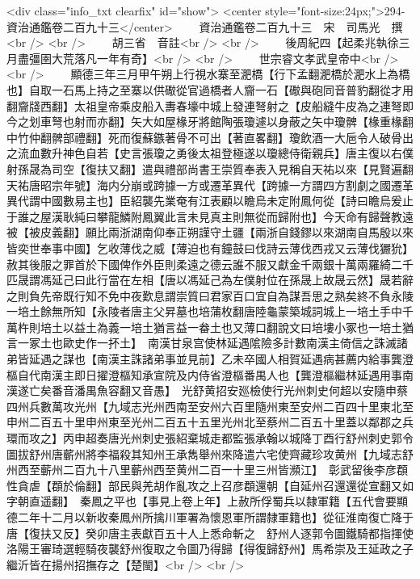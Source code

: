 <div class="info_txt clearfix" id="show">
<center style="font-size:24px;">294-資治通鑑卷二百九十三</center>
  　　資治通鑑卷二百九十三　宋　司馬光　撰<br />
<br />
　　胡三省　音註<br />
<br />
　　後周紀四【起柔兆執徐三月盡彊圉大荒落凡一年有奇】<br />
<br />
　　世宗睿文孝武皇帝中<br />
<br />
　　顯德三年三月甲午朔上行視水寨至淝橋【行下孟翻淝橋於淝水上為橋也】自取一石馬上持之至寨以供礮從官過橋者人齎一石【礮與砲同音普豹翻從才用翻齎牋西翻】太祖皇帝乘皮船入夀春壕中城上發連弩射之【皮船縫牛皮為之連弩即今之划車弩也射而亦翻】矢大如屋椽牙將館陶張瓊遽以身蔽之矢中瓊髀【椽重椽翻中竹仲翻髀部禮翻】死而復蘇鏃著骨不可出【著直畧翻】瓊飲酒一大巵令人破骨出之流血數升神色自若【史言張瓊之勇後太祖登極遂以瓊總侍衛親兵】唐主復以右僕射孫晟為司空【復扶又翻】遣與禮部尚書王崇質奉表入見稱自天祐以來【見賢遍翻天祐唐昭宗年號】海内分崩或跨據一方或遷革異代【跨據一方謂四方割劇之國遷革異代謂中國數易主也】臣紹襲先業奄有江表顧以瞻烏未定附鳳何從【詩曰瞻烏爰止于誰之屋漢耿純曰攀龍鱗附鳳翼此言未見真主則無從而歸附也】今天命有歸聲教遠被【被皮義翻】願比兩浙湖南仰奉正朔謹守土疆【兩浙自錢鏐以來湖南自馬殷以來皆奕世奉事中國】乞收薄伐之威【薄迫也有鐘鼓曰伐詩云薄伐西戎又云薄伐玁狁】赦其後服之罪首於下國俾作外臣則柔遠之德云誰不服又獻金千兩銀十萬兩羅綺二千匹晟謂馮延己曰此行當在左相【唐以馮延己為左僕射位在孫晟上故晟云然】晟若辭之則負先帝既行知不免中夜歎息謂崇質曰君家百口宜自為謀吾思之熟矣終不負永陵一培土餘無所知【永陵者唐主父昇墓也培蒲枚翻唐陸龜蒙築城詞城上一培土手中千萬杵則培土以益土為義一培土猶言益一畚土也又薄口翻說文曰培塿小冢也一培土猶言一冢土也歐史作一抔土】　南漢甘泉宫使林延遇隂險多計數南漢主倚信之誅滅諸弟皆延遇之謀也【南漢主誅諸弟事並見前】乙未卒國人相賀延遇病甚薦内給事龔澄樞自代南漢主即日擢澄樞知承宣院及内侍省澄樞番禺人也【龔澄樞繼林延遇用事南漢遂亡矣番音潘禺魚容翻又音愚】　光舒黄招安廵檢使行光州刺史何超以安隨申蔡四州兵數萬攻光州【九域志光州西南至安州六百里隨州東至安州二百四十里東北至申州二百五十里申州東至光州二百五十五里光州北至蔡州二百五十里蓋以鄰郡之兵環而攻之】丙申超奏唐光州刺史張紹棄城走都監張承翰以城降丁酉行舒州刺史郭令圖拔舒州唐蘄州將李福殺其知州王承雋舉州來降遣六宅使齊藏珍攻黄州【九域志舒州西至蘄州二百九十八里蘄州西至黄州二百一十里三州皆瀕江】　彰武留後李彦頵性貪虐【頵於倫翻】部民與羌胡作亂攻之上召彦頵還朝【自延州召還還從宣翻又如字朝直遥翻】　秦鳳之平也【事見上卷上年】上赦所俘蜀兵以隸軍籍【五代會要顯德二年十二月以新收秦鳳州所擒川軍署為懷恩軍所謂隸軍籍也】從征淮南復亡降于唐【復扶又反】癸卯唐主表獻百五十人上悉命斬之　舒州人逐郭令圖鐵騎都指揮使洛陽王審琦選輕騎夜襲舒州復取之令圖乃得歸【得復歸舒州】馬希崇及王延政之子繼沂皆在揚州招撫存之【楚閩】<br />
<br />
